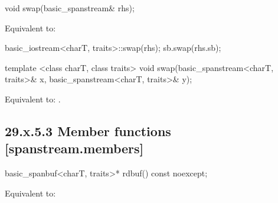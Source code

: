 \documentclass[ebook,11pt,article]{memoir}
\begin{document}
%

\begin{itemdecl}
void swap(basic_spanstream& rhs);
\end{itemdecl}

\begin{itemdescr}
\pnum
\effects Equivalent to:
\begin{codeblock}
    basic_iostream<charT, traits>::swap(rhs);
    sb.swap(rhs.sb);
\end{codeblock}
\end{itemdescr}


\begin{itemdecl}
template <class charT, class traits>
  void swap(basic_spanstream<charT, traits>& x,
            basic_spanstream<charT, traits>& y);
\end{itemdecl}

\begin{itemdescr}
\pnum
\effects Equivalent to: .
\end{itemdescr}

\subsection{29.x.5.3 Member functions [spanstream.members]}
\label{spanstream.members}

\begin{itemdecl}
basic_spanbuf<charT, traits>* rdbuf() const noexcept;
\end{itemdecl}

\begin{itemdescr}
\pnum
\effects Equivalent to: \\
\end{itemdescr}
\end{document}
